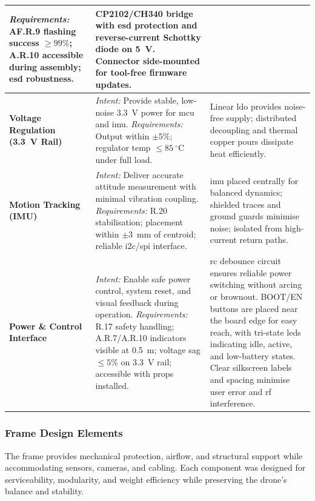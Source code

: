 \begin{longtable}{@{}p{2cm} p{6.9cm} p{6.9cm}@{}}
\textit{Requirements:} AF.R.9 flashing success $\geq 99\%$; A.R.10 accessible during assembly; \gls{esd} robustness. &
CP2102/CH340 bridge with \gls{esd} protection and reverse-current Schottky diode on 5~V. Connector side-mounted for tool-free firmware updates. \\ 
\midrule
\textbf{Voltage Regulation (3.3~V Rail)} &
\textit{Intent:} Provide stable, low-noise 3.3~V power for \gls{mcu} and \gls{imu}. \newline
\textit{Requirements:} Output within $\pm5\%$; regulator temp $\leq 85~^{\circ}$C under full load. &
Linear \gls{ldo} provides noise-free supply; distributed decoupling and thermal copper pours dissipate heat efficiently. \\ 
\midrule
\textbf{Motion Tracking (IMU)} &
\textit{Intent:} Deliver accurate attitude measurement with minimal vibration coupling. \newline
\textit{Requirements:} R.20 stabilisation; placement within $\pm3$~mm of centroid; reliable \gls{i2c}/\gls{spi} interface. &
\gls{imu} placed centrally for balanced dynamics; shielded traces and ground guards minimise noise; isolated from high-current return paths. \\ 
\midrule
\textbf{Power \& Control Interface} &
\textit{Intent:} Enable safe power control, system reset, and visual feedback during operation. \newline
\textit{Requirements:} R.17 safety handling; A.R.7/A.R.10 indicators visible at 0.5~m; voltage sag $\leq 5\%$ on 3.3~V rail; accessible with props installed. &
\gls{rc} debounce circuit ensures reliable power switching without arcing or brownout. BOOT/EN buttons are placed near the board edge for easy reach, with tri-state \glspl{led} indicating idle, active, and low-battery states. Clear silkscreen labels and spacing minimise user error and \gls{rf} interference. \\
\end{longtable}

\subsubsection{Frame Design Elements}

The frame provides mechanical protection, airflow, and structural support while accommodating sensors, cameras, and cabling. Each component was designed for serviceability, modularity, and weight efficiency while preserving the drone’s balance and stability.

